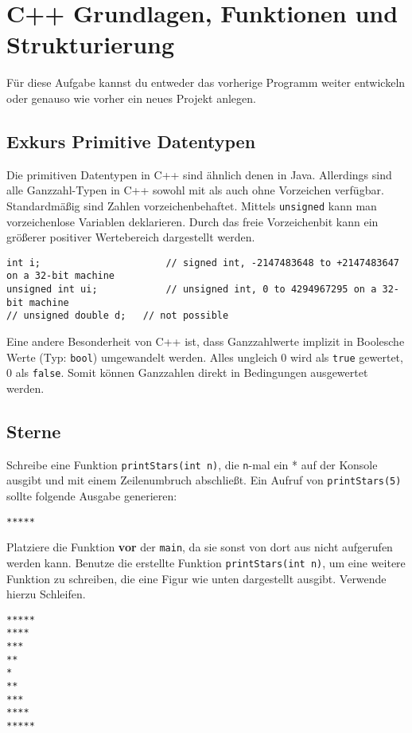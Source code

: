 \section{C++ Grundlagen, Funktionen und Strukturierung}
Für diese Aufgabe kannst du entweder das vorherige Programm weiter entwickeln oder genauso wie vorher ein neues Projekt anlegen.

\subsection*{Exkurs Primitive Datentypen}
Die primitiven Datentypen in C++ sind ähnlich denen in Java.
Allerdings sind alle Ganzzahl-Typen in C++ sowohl mit als auch ohne Vorzeichen verfügbar.
Standardmäßig sind Zahlen vorzeichenbehaftet.
Mittels \texttt{unsigned} kann man vorzeichenlose Variablen deklarieren.
Durch das freie Vorzeichenbit kann ein größerer positiver Wertebereich dargestellt werden.

\begin{lstlisting}
int i;						// signed int, -2147483648 to +2147483647 on a 32-bit machine
unsigned int ui;			// unsigned int, 0 to 4294967295 on a 32-bit machine
// unsigned double d;	// not possible
\end{lstlisting}

Eine andere Besonderheit von C++ ist, dass Ganzzahlwerte implizit in Boolesche Werte (Typ: \texttt{bool}) umgewandelt werden.
Alles ungleich 0 wird als \texttt{true} gewertet, 0 als \texttt{false}.
Somit können Ganzzahlen direkt in Bedingungen ausgewertet werden.

\subsection{Sterne}
Schreibe eine Funktion \texttt{printStars(int n)}, die \texttt{n}-mal ein * auf der Konsole ausgibt und mit einem Zeilenumbruch abschließt.
Ein Aufruf von \texttt{printStars(5)} sollte folgende Ausgabe generieren:

\begin{lstlisting}
*****
\end{lstlisting}

Platziere die Funktion \textbf{vor} der \texttt{main}, da sie sonst von dort aus nicht aufgerufen werden kann.
Benutze die erstellte Funktion \texttt{printStars(int n)}, um eine weitere Funktion zu schreiben, die eine Figur wie unten dargestellt ausgibt.
Verwende hierzu Schleifen.

\begin{lstlisting}
*****
****
***
**
*
**
***
****
*****
\end{lstlisting}

